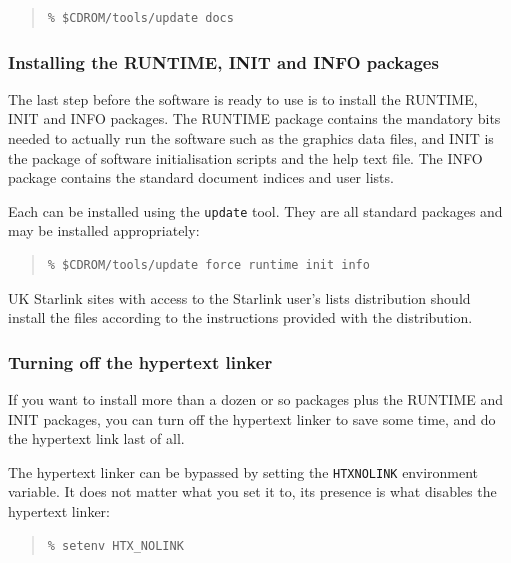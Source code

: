\documentclass[twoside,11pt]{article}
\renewcommand{\_}{\texttt{\symbol{95}}}
\begin{document}
\begin{quote}
\begin{verbatim}
% $CDROM/tools/update docs
\end{verbatim}
\end{quote}

\subsubsection{Installing the RUNTIME, INIT and INFO packages}

The last step before the software is ready to use is to install the
RUNTIME, INIT and INFO packages.  The RUNTIME package contains the
mandatory bits needed to actually run the software such as the graphics
data files, and INIT is the package of software initialisation scripts
and the help text file.  The INFO package contains the standard
document indices and user lists.

Each can be installed using the \texttt{update} tool.  They are all
standard packages and may be installed appropriately:

\begin{quote}
\begin{verbatim}
% $CDROM/tools/update force runtime init info
\end{verbatim}
\end{quote}

UK Starlink sites with access to the Starlink user's lists distribution
should install the files according to the instructions provided with
the distribution.

\subsubsection{Turning off the hypertext linker}

If you want to install more than a dozen or so packages plus the
RUNTIME and INIT packages, you can turn off the hypertext linker to
save some time, and do the hypertext link last of all.

The hypertext linker can be bypassed by setting the
\texttt{HTX\_NOLINK} environment variable.  It does not matter what you
set it to, its presence is what disables the hypertext linker:

\begin{quote}
\begin{verbatim}
% setenv HTX_NOLINK
\end{verbatim}
\end{quote}
\end{document}

